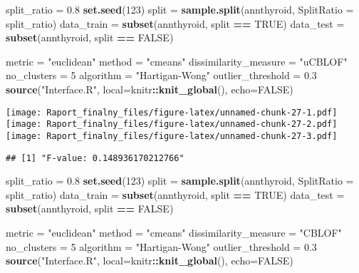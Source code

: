 \documentclass[
]{article}
\newenvironment{Shaded}{\begin{snugshade}}{\end{snugshade}}
\newcommand{\DataTypeTok}[1]{\textcolor[rgb]{0.13,0.29,0.53}{#1}}
\newcommand{\DecValTok}[1]{\textcolor[rgb]{0.00,0.00,0.81}{#1}}
\newcommand{\FloatTok}[1]{\textcolor[rgb]{0.00,0.00,0.81}{#1}}
\newcommand{\KeywordTok}[1]{\textcolor[rgb]{0.13,0.29,0.53}{\textbf{#1}}}
\newcommand{\NormalTok}[1]{#1}
\newcommand{\OperatorTok}[1]{\textcolor[rgb]{0.81,0.36,0.00}{\textbf{#1}}}
\newcommand{\OtherTok}[1]{\textcolor[rgb]{0.56,0.35,0.01}{#1}}
\newcommand{\StringTok}[1]{\textcolor[rgb]{0.31,0.60,0.02}{#1}}
\begin{document}
\begin{Shaded}
\begin{Highlighting}[]
\NormalTok{split_ratio =}\StringTok{ }\FloatTok{0.8}
\KeywordTok{set.seed}\NormalTok{(}\DecValTok{123}\NormalTok{)}
\NormalTok{split =}\StringTok{ }\KeywordTok{sample.split}\NormalTok{(annthyroid, }\DataTypeTok{SplitRatio =}\NormalTok{ split_ratio)}
\NormalTok{data_train =}\StringTok{ }\KeywordTok{subset}\NormalTok{(annthyroid, split }\OperatorTok{==}\StringTok{ }\OtherTok{TRUE}\NormalTok{)}
\NormalTok{data_test =}\StringTok{ }\KeywordTok{subset}\NormalTok{(annthyroid, split }\OperatorTok{==}\StringTok{ }\OtherTok{FALSE}\NormalTok{)}

\NormalTok{metric =}\StringTok{ "euclidean"}
\NormalTok{method =}\StringTok{ "cmeans"}
\NormalTok{dissimilarity_measure =}\StringTok{ "uCBLOF"}
\NormalTok{no_clusters =}\StringTok{ }\DecValTok{5}
\NormalTok{algorithm =}\StringTok{ "Hartigan-Wong"}
\NormalTok{outlier_threshold =}\StringTok{ }\FloatTok{0.3}
\KeywordTok{source}\NormalTok{(}\StringTok{"Interface.R"}\NormalTok{, }\DataTypeTok{local=}\NormalTok{knitr}\OperatorTok{::}\KeywordTok{knit_global}\NormalTok{(), }\DataTypeTok{echo=}\OtherTok{FALSE}\NormalTok{)}
\end{Highlighting}
\end{Shaded}

\texttt{[image: Raport\_finalny\_files/figure-latex/unnamed-chunk-27-1.pdf]}
\texttt{[image: Raport\_finalny\_files/figure-latex/unnamed-chunk-27-2.pdf]}
\texttt{[image: Raport\_finalny\_files/figure-latex/unnamed-chunk-27-3.pdf]}

\begin{verbatim}
## [1] "F-value: 0.148936170212766"
\end{verbatim}

\begin{Shaded}
\begin{Highlighting}[]
\NormalTok{split_ratio =}\StringTok{ }\FloatTok{0.8}
\KeywordTok{set.seed}\NormalTok{(}\DecValTok{123}\NormalTok{)}
\NormalTok{split =}\StringTok{ }\KeywordTok{sample.split}\NormalTok{(annthyroid, }\DataTypeTok{SplitRatio =}\NormalTok{ split_ratio)}
\NormalTok{data_train =}\StringTok{ }\KeywordTok{subset}\NormalTok{(annthyroid, split }\OperatorTok{==}\StringTok{ }\OtherTok{TRUE}\NormalTok{)}
\NormalTok{data_test =}\StringTok{ }\KeywordTok{subset}\NormalTok{(annthyroid, split }\OperatorTok{==}\StringTok{ }\OtherTok{FALSE}\NormalTok{)}

\NormalTok{metric =}\StringTok{ "euclidean"}
\NormalTok{method =}\StringTok{ "cmeans"}
\NormalTok{dissimilarity_measure =}\StringTok{ "CBLOF"}
\NormalTok{no_clusters =}\StringTok{ }\DecValTok{5}
\NormalTok{algorithm =}\StringTok{ "Hartigan-Wong"}
\NormalTok{outlier_threshold =}\StringTok{ }\FloatTok{0.3}
\KeywordTok{source}\NormalTok{(}\StringTok{"Interface.R"}\NormalTok{, }\DataTypeTok{local=}\NormalTok{knitr}\OperatorTok{::}\KeywordTok{knit_global}\NormalTok{(), }\DataTypeTok{echo=}\OtherTok{FALSE}\NormalTok{)}
\end{Highlighting}
\end{Shaded}
\end{document}
